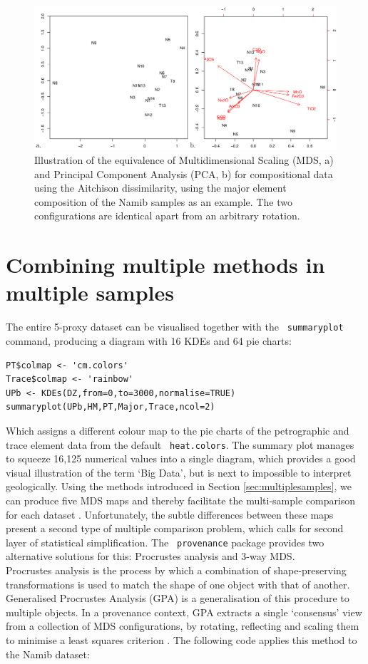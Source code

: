 \documentclass{article}
\begin{document}
\begin{figure}
\centering
\includegraphics[width=.46\textwidth]{MDSPCA.png}
\caption{Illustration of the equivalence of Multidimensional Scaling
  (MDS, a) and Principal Component Analysis (PCA, b) for compositional
  data using the Aitchison dissimilarity, using the major element
  composition of the Namib samples as an example. The two
  configurations are identical apart from an arbitrary rotation.}
\label{fig:MDSPCA}
\end{figure}

\section{Combining multiple methods in multiple samples}
\label{sec:multiplemethods}

The entire 5-proxy dataset can be visualised together with the {\tt
  summaryplot} command, producing a diagram with 16 KDEs and 64 pie
charts:

\begin{verbatim}
PT$colmap <- 'cm.colors'
Trace$colmap <- 'rainbow'
UPb <- KDEs(DZ,from=0,to=3000,normalise=TRUE)
summaryplot(UPb,HM,PT,Major,Trace,ncol=2)
\end{verbatim}

Which assigns a different colour map to the pie charts of the
petrographic and trace element data from the default {\tt
  heat.colors}. The summary plot manages to squeeze 16,125 numerical
values into a single diagram, which provides a good visual
illustration of the term `Big Data', but is next to impossible to
interpret geologically. Using the methods introduced in Section
\ref{sec:multiplesamples}, we can produce five MDS maps and thereby
facilitate the multi-sample comparison for each dataset
\citep{vermeesch2015}. Unfortunately, the subtle differences between
these maps present a second type of multiple comparison problem, which
calls for second layer of statistical simplification.  The {\tt
  provenance} package provides two alternative solutions for this:
Procrustes analysis and 3-way MDS.\\

Procrustes analysis is the process by which a combination of
shape-preserving transformations is used to match the shape of one
object with that of another. Generalised Procrustes Analysis (GPA) is
a generalisation of this procedure to multiple objects. In a
provenance context, GPA extracts a single `consensus' view from a
collection of MDS configurations, by rotating, reflecting and scaling
them to minimise a least squares criterion \citep{gower1975,
  vermeesch2015}. The following code applies this method to the Namib
dataset:
\end{document}
